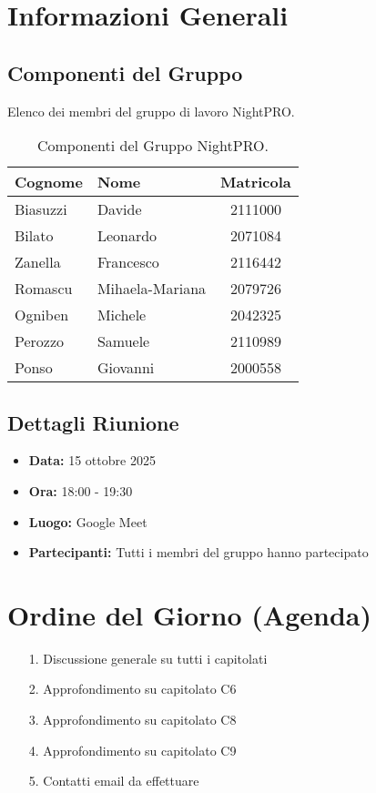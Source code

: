 \documentclass[a4paper, 11pt, oneside]{scrartcl} %
\begin{document}
\section{Informazioni Generali}

\subsection{Componenti del Gruppo}
Elenco dei membri del gruppo di lavoro NightPRO.

\begin{table}[h!]
\centering
\begin{tabular}{@{}llc@{}}
\toprule
\textbf{Cognome} & \textbf{Nome} & \textbf{Matricola} \\
\midrule
Biasuzzi & Davide & 2111000 \\
Bilato & Leonardo & 2071084 \\
Zanella & Francesco & 2116442 \\
Romascu & Mihaela-Mariana & 2079726 \\
Ogniben & Michele & 2042325 \\
Perozzo & Samuele & 2110989 \\
Ponso & Giovanni & 2000558 \\
\bottomrule
\end{tabular}
\caption{Componenti del Gruppo NightPRO.}
\end{table}

\subsection{Dettagli Riunione}
\begin{itemize}
    \item \textbf{Data:} 15 ottobre 2025
    \item \textbf{Ora:} 18:00 - 19:30
    \item \textbf{Luogo:} Google Meet
    \item \textbf{Partecipanti:} Tutti i membri del gruppo hanno partecipato
\end{itemize}


\newpage
\section{Ordine del Giorno (Agenda)}
\begin{itemize}
    \item[1.] Discussione generale su tutti i capitolati
    \item[2.] Approfondimento su capitolato C6
    \item[3.] Approfondimento su capitolato C8
    \item[4.] Approfondimento su capitolato C9
    \item[5.] Contatti email da effettuare
\end{itemize}
\end{document}
